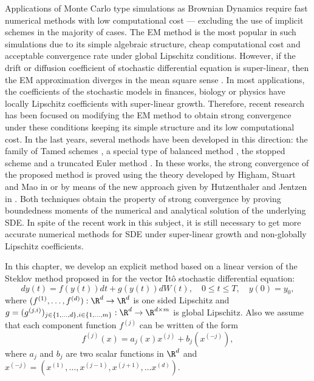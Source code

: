 	Applications of Monte Carlo type simulations \cite{Glasserman2004,Giles2008} as  Brownian Dynamics \cite{Cruz2012}
require  fast numerical methods with low computational cost --- excluding the use of 
implicit schemes in the majority of cases.
The EM method is the most popular in such  
simulations due to its simple algebraic structure, cheap computational cost and acceptable convergence rate 
under global Lipschitz conditions. 
However, if the drift or diffusion coefficient of stochastic 
differential equation  is super-linear, then the EM approximation 
diverges  in the mean square sense \cite{Hutzenthaler2009, Hutzenthaler2012b}. 
In most applications, the coefficients of the stochastic  models in finances, biology or physics 
have locally Lipschitz coefficients with super-linear growth. 
Therefore, recent research has been focused on modifying the EM method to obtain strong convergence  under these 
conditions keeping its simple structure and  its low computational cost. In the last years, 
several methods have been developed in this direction:  the family of  Tamed schemes
\cite{Hutzenthaler2012a, Wang2011, Zong2014,Hutzenthaler2015,Sabanis2015}, 
a special type of balanced method \cite{Tretyakov2013},  the stopped scheme \cite{Liu2013a} and 
a truncated Euler method  \cite{Mao2015}.
In these works, the strong convergence of the proposed method
is proved using the theory developed by Higham, Stuart and 
Mao in \cite{Higham2002b} or by means of  the new approach given by  Hutzenthaler and Jentzen in \cite{Hutzenthaler2015}.
Both techniques obtain the property of  strong convergence by proving boundedness moments of the numerical and 
analytical solution of the underlying SDE. In spite of the recent work in this subject,  it is still necessary
to get more accurate numerical methods for SDE under super-linear growth and 
non-globally Lipschitz coefficients.

In this chapter, we develop an explicit method based on a linear version  of the Steklov method proposed 
in  \cite{Diaz-Infante2015}  for the  vector It\^o stochastic differential equation:
\begin{equation}\label{eqn:SDE1}
	dy(t)
	 =f(y(t))dt + g(y(t))dW(t), \quad 0\leq t\leq T,
	\quad y(0)=y_0,
\end{equation}
where $(f^{(1)},\dots, f^{(d)}):\R^d \to \R^d$ is one sided Lipschitz and 
$g = (g^{(j,i)})_{j\in \{1,\dots,d\}, i\in\{1,\dots, m\}}:\R^d \to \R^{d\times m}$ is global Lipschitz. 
Also we assume 
that  each component function $f^{(j)}$  can be written of the form
\begin{equation}\label{eqn:AlternativeConstruction}
	f^{(j)}(x) = a_j(x) x^{(j)} + b_j (x^{(-j)}), 
\end{equation}
where $a_j$ and	$b_{j}$ are two scalar 	functions in  $\R^d$ 
and $x^{(-j)} = \left( x^{(1)},\dots,x^{(j-1)},x^{(j+1)},\dots x^{(d)}\right)$. 

